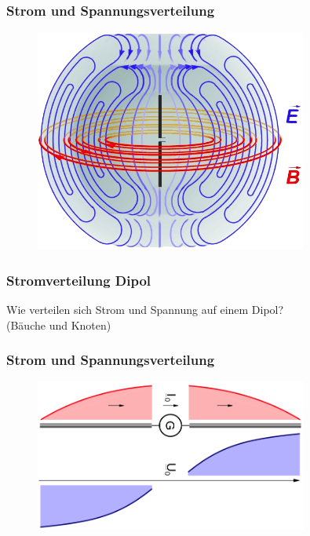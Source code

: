 \begin{frame}
  \frametitle{Strom und Spannungsverteilung}
  \begin{center}
    \begin{figure}
      \includegraphics[width=0.8\textwidth,height=.75\textheight,keepaspectratio]{a09/Felder_um_Dipol.png}
    \end{figure}
  \end{center}
\end{frame}

\begin{frame}
  \frametitle{Stromverteilung Dipol}
  \begin{center}
    \Large Wie verteilen sich Strom und Spannung auf einem Dipol? \\ (Bäuche und Knoten)
  \end{center}
\end{frame}

\begin{frame}
  \frametitle{Strom und Spannungsverteilung}
  \begin{center}
    \begin{figure}
      \includegraphics[width=0.8\textwidth,height=.75\textheight,keepaspectratio]{a09/DipolUI.png}
    \end{figure}
  \end{center}
\end{frame}

